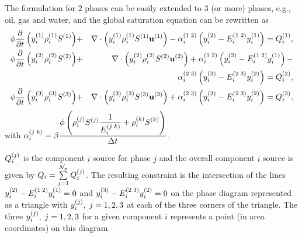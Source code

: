 The formulation for 2 phases can be easily extended to 3 (or more) phases, e.g., oil, gas and water, and the global saturation equation can be rewritten as 
     \begin{eqnarray}
               \phi  \frc{\partial}{\partial t}\left(\mfr[y]{i}{1}\mfr[\rho]{i}{1}\mfr[S]{}{1} \right) &+& \nabla\cdot\left(\mfr[y]{i}{1}\mfr[\rho]{i}{1}\mfr[S]{}{1}\mfr[\mathbf{u}]{}{1}  \right) - \mfr[\alpha]{i}{1\;2} \left(\mfr[y]{i}{2} - \mfr[E]{i}{1\;2}\mfr[y]{i}{1}\right)  = \mfr[Q]{i}{1} ,\nonumber \label{phase1-comp-i} \\
               \phi \frc{\partial}{\partial t}\left(\mfr[y]{i}{2}\mfr[\rho]{i}{2}\mfr[S]{}{2} \right) &+&  \nabla\cdot\left( \mfr[y]{i}{2}\mfr[\rho]{i}{2}\mfr[S]{}{2}\mfr[\mathbf{u}]{}{2} \right) + \mfr[\alpha]{i}{1\;2} \left(\mfr[y]{i}{2} - \mfr[E]{i}{1\;2} \mfr[y]{i}{1}\right)   - \nonumber \\
              &&  \mfr[\alpha]{i}{2\;3} \left(\mfr[y]{i}{3} - \mfr[E]{i}{2\;3} \mfr[y]{i}{2}\right) = \mfr[Q]{i}{2} , \nonumber \label{phase2-comp-i} \\
               \phi \frc{\partial}{\partial t}\left(\mfr[y]{i}{3}\mfr[\rho]{i}{3}\mfr[S]{}{3} \right) &+&  \nabla\cdot\left( \mfr[y]{i}{3}\mfr[\rho]{i}{3}\mfr[S]{}{3}\mfr[\mathbf{u}]{}{3}  \right) +  \mfr[\alpha]{i}{2\;3} \left(\mfr[y]{i}{3} - \mfr[E]{i}{2\;3} \mfr[y]{i}{2}\right) = \mfr[Q]{i}{3}, \nonumber\label{phase3-comp-i}
    \end{eqnarray}
with $\mfr[\alpha]{i}{j\;k} = \beta \frc{\phi \left(\mfr[\rho]{i}{j}\mfr[S]{}{j}  \frc{1}{\mfr[E]{i}{j\;k}} +\mfr[\rho]{i}{k}\mfr[S]{}{k} \right)}{\Delta t} $.


$\mfr[Q]{i}{j}$ is the component $i$ source for phase $j$ and the overall component $i$ source is given by $Q_i=\summation_{j=1}^{{\cal N}_p} \mfr[Q]{i}{j}$.  The resulting constraint is the intersection of the lines $\mfr[y]{i}{2} - \mfr[E]{i}{1\;2} \mfr[y]{i}{1}=0$ and $\mfr[y]{i}{3} - \mfr[E]{i}{2\;3}\mfr[y]{i}{2}= 0$ on the phase diagram represented as a triangle with $\mfr[y]{i}{j}, \; j =1,2,3$ at each of the three corners of the triangle. The three $\mfr[y]{i}{j}, \; j =1,2,3$ for a given component $i$ represents a point (in area coordinates) on this diagram.
